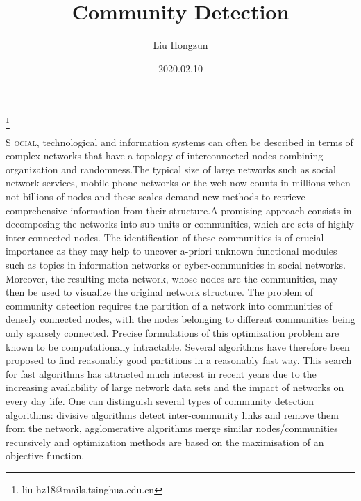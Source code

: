 \documentclass[UTF8, onecolumn, a4paper]{article}
\title{Community Detection}%
\author{Liu Hongzun}
\affil{Department of Computer Science, Tsinghua University}
\date{2020.02.10}
\begin{document}
	\thanks{liu-hz18@mails.tsinghua.edu.cn}
	\maketitle %
	\setlength{\columnsep}{25pt}%
	\columnseprule=0.7pt %
	\begin{multicols}{2}%
		\lettrine[lines=2]{S}{ ocial}, technological and information systems can often be described in terms of complex
		networks that have a topology of interconnected nodes combining organization and
		randomness.The typical size of large networks such as social network services, mobile phone networks or the web now counts in millions when not billions of nodes
		and these scales demand new methods to retrieve comprehensive information from their
		structure.A promising approach consists in decomposing the networks into sub-units
		or communities, which are sets of highly inter-connected nodes. The identification of
		these communities is of crucial importance as they may help to uncover a-priori unknown
		functional modules such as topics in information networks or cyber-communities in social
		networks. Moreover, the resulting meta-network, whose nodes are the communities, may
		then be used to visualize the original network structure.
		The problem of community detection requires the partition of a network into
		communities of densely connected nodes, with the nodes belonging to different
		communities being only sparsely connected. Precise formulations of this optimization
		problem are known to be computationally intractable. Several algorithms have therefore
		been proposed to find reasonably good partitions in a reasonably fast way. This search
		for fast algorithms has attracted much interest in recent years due to the increasing
		availability of large network data sets and the impact of networks on every day life. One
		can distinguish several types of community detection algorithms: divisive algorithms
		detect inter-community links and remove them from the network, agglomerative
		algorithms merge similar nodes/communities recursively and optimization methods
		are based on the maximisation of an objective function.
	\end{multicols}
\end{document}

